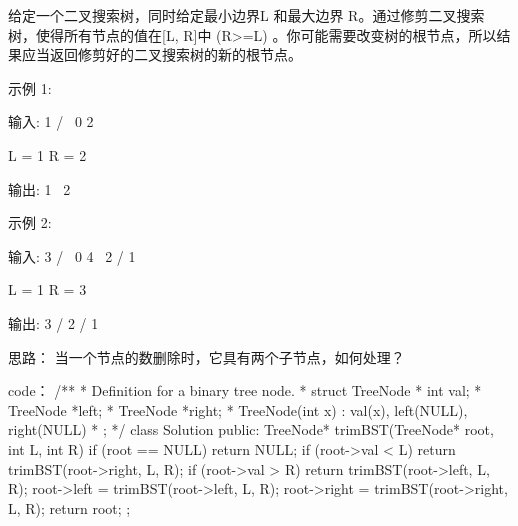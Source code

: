 给定一个二叉搜索树，同时给定最小边界L 和最大边界 R。通过修剪二叉搜索树，使得所有节点的值在[L, R]中 (R>=L) 。你可能需要改变树的根节点，所以结果应当返回修剪好的二叉搜索树的新的根节点。

示例 1:

输入: 
    1
   / \
  0   2

  L = 1
  R = 2

输出: 
    1
      \
       2

示例 2:

输入: 
    3
   / \
  0   4
   \
    2
   /
  1

  L = 1
  R = 3

输出: 
      3
     / 
   2   
  /
 1





























思路：
当一个节点的数删除时，它具有两个子节点，如何处理？

































code：
/**
 * Definition for a binary tree node.
 * struct TreeNode {
 *     int val;
 *     TreeNode *left;
 *     TreeNode *right;
 *     TreeNode(int x) : val(x), left(NULL), right(NULL) {}
 * };
 */
class Solution {
public:
    TreeNode* trimBST(TreeNode* root, int L, int R) {
        if (root == NULL) return NULL;
        if (root->val < L) return trimBST(root->right, L, R);
        if (root->val > R) return trimBST(root->left, L, R);
        root->left = trimBST(root->left, L, R);
        root->right = trimBST(root->right, L, R);
        return root;
    }
};
